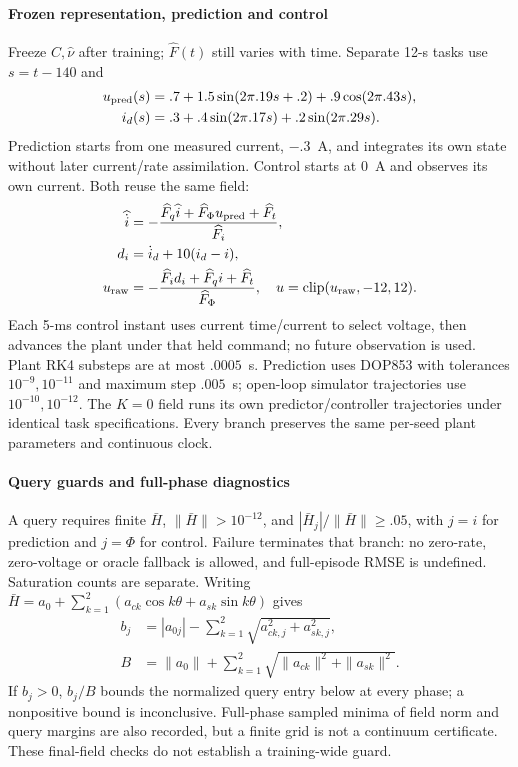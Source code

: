\paragraph{Frozen representation, prediction and control}
Freeze $C,\widehat\nu$ after training; $\widehat F(t)$ still varies with time.
Separate 12-s tasks use $s=t-140$ and
\begin{align}
 u_{\rm pred}(s)&=.7+1.5\sin(2\pi .19s+.2)+.9\cos(2\pi .43s),\nonumber\\
 i_d(s)&=.3+.4\sin(2\pi .17s)+.2\sin(2\pi .29s).
 \label{eq:df_test_input}
\end{align}
Prediction starts from one measured current, $-.3$~A, and integrates its own
state without later current/rate assimilation. Control starts at $0$~A and
observes its own current. Both reuse the same field:
\begin{align}
 \widehat{\dot i}&=-\frac{\widehat F_q\widehat i+
                  \widehat F_\Phi u_{\rm pred}+\widehat F_t}{\widehat F_i},\nonumber\\
 d_i&=\dot i_d+10(i_d-i),\nonumber\\
 u_{\rm raw}&=-\frac{\widehat F_i d_i+\widehat F_q i+
                       \widehat F_t}{\widehat F_\Phi},\quad
 u=\operatorname{clip}(u_{\rm raw},-12,12).
 \label{eq:df_readout}
\end{align}
Each 5-ms control instant uses current time/current to select voltage, then
advances the plant under that held command; no future observation is used.
Plant RK4 substeps are at most $.0005$~s. Prediction uses DOP853 with tolerances
$10^{-9},10^{-11}$ and maximum step $.005$~s; open-loop simulator trajectories
use $10^{-10},10^{-12}$. The $K=0$ field runs its own predictor/controller
trajectories under identical task specifications. Every branch preserves the
same per-seed plant parameters and continuous clock.

\paragraph{Query guards and full-phase diagnostics}
A query requires finite $\bar H$, $\|\bar H\|>10^{-12}$, and
$|\bar H_j|/\|\bar H\|\ge .05$, with $j=i$ for prediction and $j=\Phi$ for
control. Failure terminates that branch: no zero-rate, zero-voltage or oracle
fallback is allowed, and full-episode RMSE is undefined. Saturation counts
are separate. Writing
$\bar H=a_0+\sum_{k=1}^2(a_{ck}\cos k\theta+a_{sk}\sin k\theta)$ gives
\begin{equation}
 \begin{split}
 b_j&=|a_{0j}|-\sum_{k=1}^2\sqrt{a_{ck,j}^2+a_{sk,j}^2},\\
 B&=\|a_0\|+\sum_{k=1}^2\sqrt{\|a_{ck}\|^2+\|a_{sk}\|^2}.
 \end{split}\label{eq:df_guard}
\end{equation}
If $b_j>0$, $b_j/B$ bounds the normalized query entry below at every phase;
a nonpositive bound is inconclusive. Full-phase sampled minima of field norm
and query margins are also recorded, but a finite grid is not a continuum
certificate. These final-field checks do not establish a training-wide guard.

